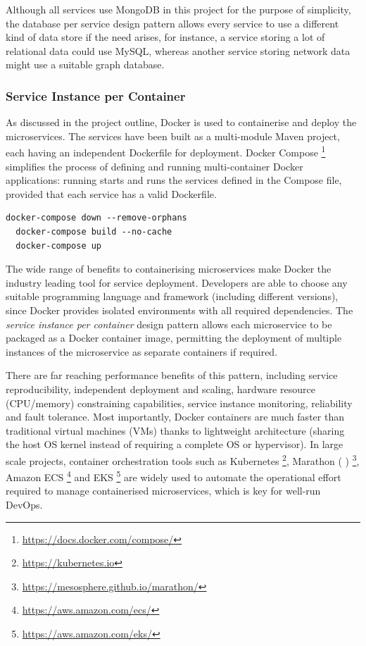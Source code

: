 Although all services use MongoDB in this project for the purpose of simplicity, the database per service design pattern allows every service to use a different kind of data store if the need arises, for instance, a service storing a lot of relational data could use MySQL, whereas another service storing network data might use a suitable graph database.

\subsubsection{Service Instance per Container}

As discussed in the project outline, Docker is used to containerise and deploy the microservices. The services have been built as a multi-module Maven project, each having an independent Dockerfile for deployment. Docker Compose \footnote{\url{https://docs.docker.com/compose/}} simplifies the process of defining and running multi-container Docker applications: running  starts and runs the services defined in the Compose file, provided that each service has a valid Dockerfile.

\begin{lstlisting}[caption=Sample Docker Compose commands to start the microservices]
  docker-compose down --remove-orphans
  docker-compose build --no-cache
  docker-compose up
\end{lstlisting}

The wide range of benefits to containerising microservices make Docker the industry leading tool for service deployment. Developers are able to choose any suitable programming language and framework (including different versions), since Docker provides isolated environments with all required dependencies. The \textit{service instance per container} design pattern allows each microservice to be packaged as a Docker container image, permitting the deployment of multiple instances of the microservice as separate containers if required.

There are far reaching performance benefits of this pattern, including service reproducibility, independent deployment and scaling, hardware resource (CPU/memory) constraining capabilities, service instance monitoring, reliability and fault tolerance. Most importantly, Docker containers are much faster than traditional virtual machines (VMs) thanks to lightweight architecture (sharing the host OS kernel instead of requiring a complete OS or hypervisor). In large scale projects, container orchestration tools such as Kubernetes \footnote{\url{https://kubernetes.io}}, Marathon (  ) \footnote{\url{https://mesosphere.github.io/marathon/}}, Amazon ECS \footnote{\url{https://aws.amazon.com/ecs/}} and EKS \footnote{\url{https://aws.amazon.com/eks/}} are widely used to automate the operational effort required to manage containerised microservices, which is key for well-run DevOps.


